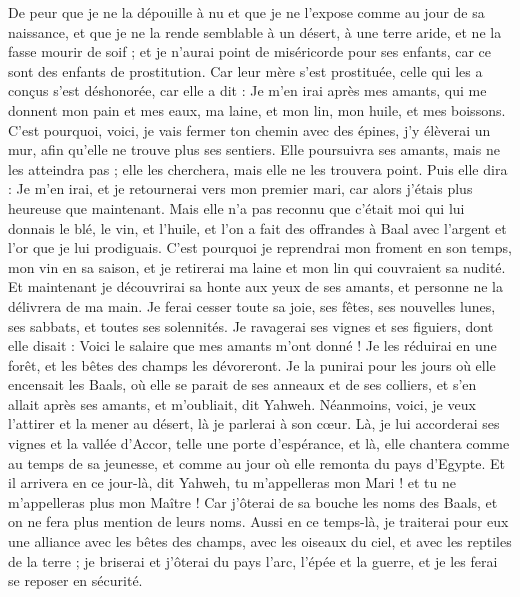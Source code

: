 \begin{multicols}{2}
De peur que je ne la dépouille à nu et que je ne l’expose comme au jour de sa naissance, et que je ne la rende semblable à un désert, à une terre aride, et ne la fasse mourir de soif ;
et je n’aurai point de miséricorde pour ses enfants, car ce sont des enfants de prostitution.
Car leur mère s'est prostituée, celle qui les a conçus s'est déshonorée, car elle a dit : Je m'en irai après mes amants, qui me donnent mon pain et mes eaux, ma laine, et mon lin, mon huile, et mes boissons.
C'est pourquoi, voici, je vais fermer ton chemin avec des épines, j'y élèverai un mur, afin qu’elle ne trouve plus ses sentiers.
Elle poursuivra ses amants, mais ne les atteindra pas ; elle les cherchera, mais elle ne les trouvera point. Puis elle dira : Je m'en irai, et je retournerai vers mon premier mari, car alors j'étais plus heureuse que maintenant.
Mais elle n'a pas reconnu que c'était moi qui lui donnais le blé, le vin, et l'huile, et l’on a fait des offrandes à Baal avec l’argent et l’or que je lui prodiguais.
C'est pourquoi je reprendrai mon froment en son temps, mon vin en sa saison, et je retirerai ma laine et mon lin qui couvraient sa nudité.
Et maintenant je découvrirai sa honte aux yeux de ses amants, et personne ne la délivrera de ma main.
Je ferai cesser toute sa joie, ses fêtes, ses nouvelles lunes, ses sabbats, et toutes ses solennités.
Je ravagerai ses vignes et ses figuiers, dont elle disait : Voici le salaire que mes amants m'ont donné ! Je les réduirai en une forêt, et les bêtes des champs les dévoreront.
Je la punirai pour les jours où elle encensait les Baals, où elle se parait de ses anneaux et de ses colliers, et s'en allait après ses amants, et m'oubliait, dit Yahweh.
Néanmoins, voici, je veux l'attirer et la mener au désert, là je parlerai à son cœur.
Là, je lui accorderai ses vignes et la vallée d’Accor, telle une porte d’espérance, et là, elle chantera comme au temps de sa jeunesse, et comme au jour où elle remonta du pays d'Egypte.
 Et il arrivera en ce jour-là, dit Yahweh, tu m'appelleras mon Mari ! et tu ne m'appelleras plus mon Maître !
Car j'ôterai de sa bouche les noms des Baals, et on ne fera plus mention de leurs noms.
Aussi en ce temps-là, je traiterai pour eux une alliance avec les bêtes des champs, avec les oiseaux du ciel, et avec les reptiles de la terre ; je briserai et j'ôterai du pays l'arc, l'épée et la guerre, et je les ferai se reposer en sécurité.

\end{multicols}
